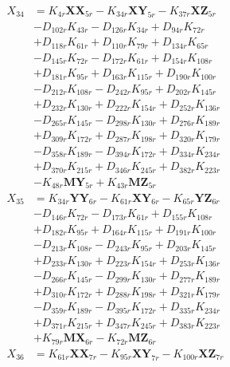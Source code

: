 \begin{multicols}{2}
\begin{align}
X_{34} &= K_{4r}\mathbf{XX}_{5r} - K_{34r}\mathbf{XY}_{5r} - K_{37r}\mathbf{XZ}_{5r}  \nonumber \\
&- D_{102r}K_{43r} - D_{126r}K_{34r} + D_{94r}K_{72r}  \nonumber \\
&+ D_{118r}K_{61r} + D_{110r}K_{79r} + D_{134r}K_{65r}  \nonumber \\
&- D_{145r}K_{72r} - D_{172r}K_{61r} + D_{154r}K_{108r}  \nonumber \\
&+ D_{181r}K_{95r} + D_{163r}K_{115r} + D_{190r}K_{100r}  \nonumber \\
&- D_{212r}K_{108r} - D_{242r}K_{95r} + D_{202r}K_{145r}  \nonumber \\
&+ D_{232r}K_{130r} + D_{222r}K_{154r} + D_{252r}K_{136r}  \nonumber \\
&- D_{265r}K_{145r} - D_{298r}K_{130r} + D_{276r}K_{189r}  \nonumber \\
&+ D_{309r}K_{172r} + D_{287r}K_{198r} + D_{320r}K_{179r}  \nonumber \\
&- D_{358r}K_{189r} - D_{394r}K_{172r} + D_{334r}K_{234r}  \nonumber \\
&+ D_{370r}K_{215r} + D_{346r}K_{245r} + D_{382r}K_{223r}  \nonumber \\
&- K_{48r}\mathbf{MY}_{5r} + K_{43r}\mathbf{MZ}_{5r} \nonumber \\
X_{35} &= K_{34r}\mathbf{YY}_{6r} - K_{61r}\mathbf{XY}_{6r} - K_{65r}\mathbf{YZ}_{6r}  \nonumber \\
&- D_{146r}K_{72r} - D_{173r}K_{61r} + D_{155r}K_{108r}  \nonumber \\
&+ D_{182r}K_{95r} + D_{164r}K_{115r} + D_{191r}K_{100r}  \nonumber \\
&- D_{213r}K_{108r} - D_{243r}K_{95r} + D_{203r}K_{145r}  \nonumber \\
&+ D_{233r}K_{130r} + D_{223r}K_{154r} + D_{253r}K_{136r}  \nonumber \\
&- D_{266r}K_{145r} - D_{299r}K_{130r} + D_{277r}K_{189r}  \nonumber \\
&+ D_{310r}K_{172r} + D_{288r}K_{198r} + D_{321r}K_{179r}  \nonumber \\
&- D_{359r}K_{189r} - D_{395r}K_{172r} + D_{335r}K_{234r}  \nonumber \\
&+ D_{371r}K_{215r} + D_{347r}K_{245r} + D_{383r}K_{223r}  \nonumber \\
&+ K_{79r}\mathbf{MX}_{6r} - K_{72r}\mathbf{MZ}_{6r} \nonumber \\
X_{36} &= K_{61r}\mathbf{XX}_{7r} - K_{95r}\mathbf{XY}_{7r} - K_{100r}\mathbf{XZ}_{7r}  \nonumber \\

\end{align}
\end{multicols}
